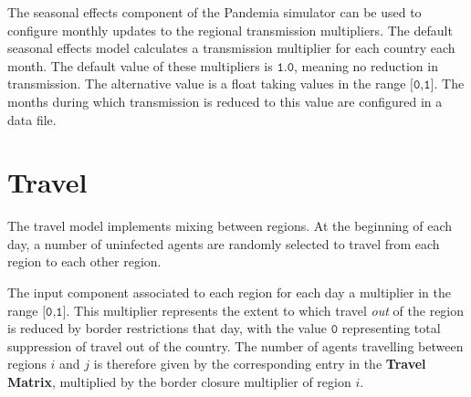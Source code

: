 \documentclass[10pt,letterpaper]{article}
\begin{document}
The seasonal effects component of the Pandemia simulator can be used to configure monthly updates to the regional transmission multipliers. The default seasonal effects model calculates a transmission multiplier for each country each month. The default value of these multipliers is $\texttt{1.0}$, meaning no reduction in transmission. The alternative value is a float taking values in the range $\texttt{[0,1]}$. The months during which transmission is reduced to this value are configured in a data file.

\section{Travel}

The travel model implements mixing between regions. At the beginning of each day, a number of uninfected agents are randomly selected to travel from each region to each other region.

The input component associated to each region for each day a multiplier in the range $\texttt{[0,1]}.$ This multiplier represents the extent to which travel \textit{out} of the region is reduced by border restrictions that day, with the value $\texttt{0}$ representing total suppression of travel out of the country. The number of agents travelling between regions $i$ and $j$ is therefore given by the corresponding entry in the \textbf{Travel Matrix}, multiplied by the border closure multiplier of region $i$.
\end{document}
